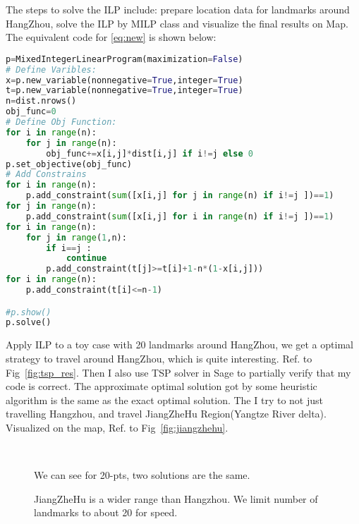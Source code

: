 \documentclass{mcmthesis}
\begin{document}
The steps to solve the ILP include: prepare location data for landmarks around HangZhou, solve the ILP by MILP class and visualize the final results on Map. The equivalent code for \eqref{eq:new} is shown below:

\begin{lstlisting}[language=Python]
p=MixedIntegerLinearProgram(maximization=False) 
# Define Varibles:
x=p.new_variable(nonnegative=True,integer=True)
t=p.new_variable(nonnegative=True,integer=True)
n=dist.nrows()
obj_func=0
# Define Obj Function:
for i in range(n):
	for j in range(n):
		obj_func+=x[i,j]*dist[i,j] if i!=j else 0
p.set_objective(obj_func)
# Add Constrains
for i in range(n):
	p.add_constraint(sum([x[i,j] for j in range(n) if i!=j ])==1)
for j in range(n):
	p.add_constraint(sum([x[i,j] for i in range(n) if i!=j ])==1)
for i in range(n):
	for j in range(1,n):
		if i==j :
			continue
		p.add_constraint(t[j]>=t[i]+1-n*(1-x[i,j]))
for i in range(n):
	p.add_constraint(t[i]<=n-1)

#p.show()
p.solve()
\end{lstlisting}

Apply ILP to a toy case with 20 landmarks around HangZhou, we get a optimal strategy to travel around HangZhou, which is quite interesting. Ref. to Fig~\vref{fig:tsp_res}. Then I also use TSP solver in Sage to partially verify that my code is correct. The approximate optimal solution got by some heuristic algorithm is the same as the exact optimal solution. The I try to not just travelling Hangzhou, and travel JiangZheHu Region(Yangtze River delta). Visualized on the map, Ref. to Fig~\vref{fig:jiangzhehu}. 

\begin{figure}
	\centering
	 \quad  
	\\
	  \quad 
	\caption[Results]{ We can see for 20-pts, two solutions are the same.  } 
\end{figure}
\begin{figure}
	\centering
	 \quad  
	\caption[Results]{JiangZheHu is a wider range than Hangzhou. We limit number of landmarks to about 20 for speed.} 
\end{figure}
\end{document}
